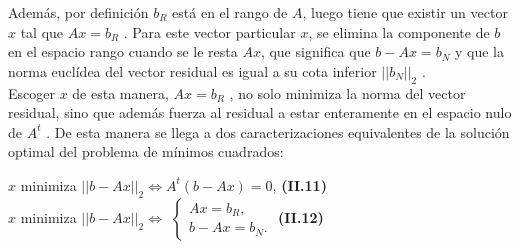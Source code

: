 \documentclass[twocolumn,twoside]{article}
\begin{document}
Adem\'as, por definici\'on $b_R$ est\'a en el rango de $A$, luego tiene que existir un
vector $x$ tal que $A x = b_R$ . Para este vector particular $x$, se elimina la componente de
$b$ en el espacio rango cuando se le resta $A x$, que significa que $b - A x = b_N$ y que la
norma eucl\'idea del vector residual es igual a su cota inferior $||b_N ||_2$ .\\
Escoger $x$ de esta manera, $A x = b_R$ , no solo minimiza la norma del vector residual,
sino que adem\'as fuerza al residual a estar enteramente en el espacio nulo de $A^t$ . De esta
manera se llega a dos caracterizaciones equivalentes de la soluci\'on optimal del problema
de m\'inimos cuadrados:
\begin{center}
  $x$ minimiza $||b - A x||_2 \Longleftrightarrow A^t (b - A x) = 0$, \textbf{(II.11)}\\
  $x$ minimiza $||b - A x||_2 \Longleftrightarrow$
  $\left \{ \begin{matrix} A x = b_R ,\\ 
  b - Ax = b_N .\end{matrix}\right.$ \textbf{(II.12)}
\end{center}
\end{document}
